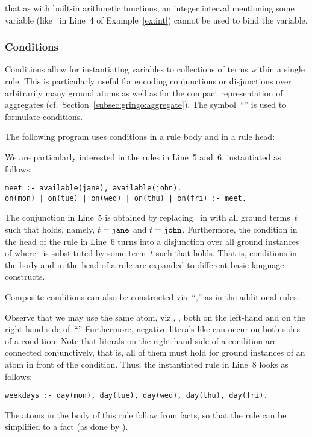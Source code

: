 \begin{Note}
that as with built-in arithmetic functions,
an integer interval mentioning some variable (like~ in Line~4 of Example~\ref{ex:int})
cannot be used to bind the variable.
\end{Note}

\subsubsection{Conditions}\label{subsec:gringo:condition}

Conditions allow for instantiating variables to
collections of terms within a single rule.
This is particularly useful for encoding conjunctions or disjunctions over
arbitrarily many ground atoms as well as for the compact representation of aggregates
(cf.\ Section~\ref{subsec:gringo:aggregate}).
The symbol~``\code{:}'' is used to formulate conditions.

\begin{example}\label{ex:cond}
The following program uses conditions in a rule body and in a rule head:
%

%
We are particularly interested in the rules in Line~5 and~6,
instantiated as follows:%
%
\begin{lstlisting}[firstnumber=5]
meet :- available(jane), available(john).
on(mon) | on(tue) | on(wed) | on(thu) | on(fri) :- meet.
\end{lstlisting}
%
The conjunction in Line~5 is obtained by replacing~ in
 with all ground terms~$t$ such that
 holds, namely, $t=\texttt{jane}$ and $t=\texttt{john}$.
Furthermore, the condition in the head of the rule in Line~6 turns into
a disjunction over all ground instances of
 where~ is substituted by some term~$t$
such that
 holds.
That is, conditions in the body and in the head of a rule
are expanded to different basic language constructs.

Composite conditions can also be constructed via~``\code{:},''
as in the additional rules:
%

%
Observe that we may use the same atom, viz., ,
both on the left-hand and on the right-hand side of~``\code{:}.''
Furthermore, negative literals like 
can occur on both sides of a condition.
Note that literals on the right-hand side of a condition are connected conjunctively, that is,
all of them must hold for ground instances of an atom in front
of the condition.
Thus, the instantiated rule in Line~8 looks as follows:
%
\begin{lstlisting}[firstnumber=8]
weekdays :- day(mon), day(tue), day(wed), day(thu), day(fri).
\end{lstlisting}
%
The atoms in the body of this rule follow from facts, so that
the rule can be simplified to a fact 
(as done by \gringo).
\eexample
\end{example}

